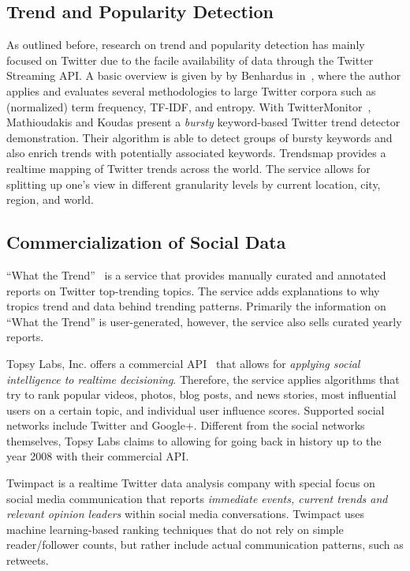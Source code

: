 \documentclass{iosart2c}
\begin{document}
\subsection{Trend and Popularity Detection}
As outlined before, research on trend and popularity detection has mainly focused on Twitter due to the facile availability of data through the Twitter Streaming API.
A basic overview is given by by Benhardus in~\cite{benhardus2010streaming}, where the author applies and evaluates several methodologies to large Twitter corpora such as (normalized) term frequency, TF-IDF, and entropy.
With TwitterMonitor~\cite{Mathioudakis:2010:TTD:1807167.1807306}, Mathioudakis and Koudas present a \textit{bursty} keyword-based Twitter trend detector demonstration.
Their algorithm is able to detect groups of bursty keywords and also enrich trends with potentially associated keywords.
Trendsmap provides a realtime mapping of Twitter trends across the world.
The service allows for splitting up one's view in different granularity levels by current location, city, region, and world.

\subsection{Commercialization of Social Data}
``What the Trend''~\cite{whatthetrend} is a service that provides manually curated and annotated reports on Twitter top-trending topics.
The service adds explanations to why tropics trend and data behind trending patterns.
Primarily the information on ``What the Trend'' is user-generated, however, the service also sells curated yearly reports.

Topsy Labs, Inc. offers a commercial API~\cite{topsy} that allows for \textit{applying social intelligence to realtime decisioning}.
Therefore, the service applies algorithms that try to rank popular videos, photos, blog posts, and news stories, most influential users on a certain topic, and individual user influence scores.
Supported social networks include Twitter and Google+.
Different from the social networks themselves, Topsy Labs claims to allowing for going back in history up to the year 2008 with their commercial API.

Twimpact \cite{twimpact} is a realtime Twitter data analysis company with special focus on social media communication that reports \textit{immediate events, current trends and relevant opinion leaders} within social media conversations.
Twimpact uses machine learning-based ranking techniques that do not rely on simple reader/follower counts, but rather include actual communication patterns, such as retweets. 
\end{document}
